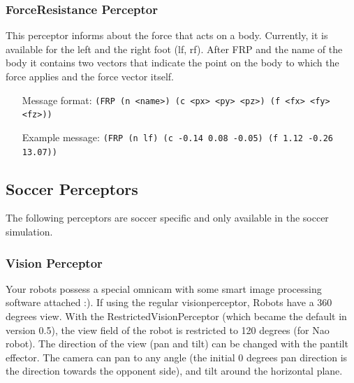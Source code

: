 \subsubsection{ForceResistance Perceptor}
\label{sec:FRP}

This perceptor informs about the force that acts on a body. Currently, it is
available for the left and the right foot (lf, rf).
After FRP and the name of the body it contains two vectors that indicate the
point on the body to which the force applies and the force vector itself.



\begin{itemize}
	\item[Message format:] \texttt{(FRP (n <name>) (c <px> <py> <pz>) (f <fx> <fy>
	<fz>))}
	\item[Example message:] \texttt{(FRP (n lf) (c -0.14 0.08 -0.05) (f 1.12 -0.26
	13.07))}
\end{itemize}

\subsection{Soccer Perceptors}
\label{sec:soccerperceptors}

The following perceptors are soccer specific and only available in the soccer
simulation.

\subsubsection{Vision Perceptor}
\label{sec:visionperceptor}

Your robots possess a special omnicam with some smart image processing
software attached :). If using the regular visionperceptor, Robots
have a 360 degrees view. With the RestrictedVisionPerceptor (which
became the default in version 0.5), the view field of the robot is
restricted to 120 degrees (for Nao robot). The direction of the view (pan and tilt) can be
changed with the pantilt effector. The camera can pan to any angle
(the initial 0 degrees pan direction is the direction towards the
opponent side), and tilt around the horizontal plane.

